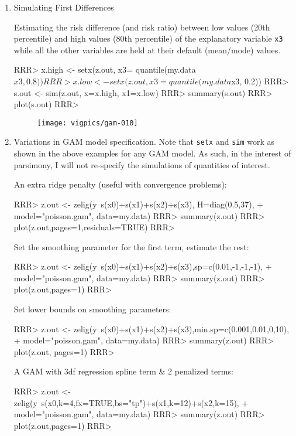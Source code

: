 \begin{enumerate}
\item Simulating First Differences

Estimating the risk difference (and risk ratio) between low values (20th percentile) and high values (80th percentile) of the explanatory variable {\tt x3} while all the other variables are held at their default (mean/mode) values. 

\begin{Schunk}
\begin{Sinput}
RRR> x.high <- setx(z.out,  x3= quantile(my.data$x3, 0.8))
RRR> x.low <- setx(z.out, x3 = quantile(my.data$x3, 0.2))
RRR> s.out <- sim(z.out, x=x.high, x1=x.low)
RRR> summary(s.out)
RRR> plot(s.out)
RRR> 
\end{Sinput}
\end{Schunk}
\begin{figure}[here]
\centering
\texttt{[image: vigpics/gam-010]}
\label{fig:plotgam}
\end{figure}

\item Variations in GAM model specification. Note that {\tt setx} and {\tt sim} work as shown in the above examples for any GAM model. As such, in the interest of parsimony, I will not re-specify the simulations of quantities of interest. 

An extra ridge penalty (useful with convergence problems):
\begin{Schunk}
\begin{Sinput}
RRR> z.out <- zelig(y~s(x0)+s(x1)+s(x2)+s(x3), H=diag(0.5,37), 
+    model="poisson.gam", data=my.data) 
RRR> summary(z.out)
RRR> plot(z.out,pages=1,residuals=TRUE)
RRR> 
\end{Sinput}
\end{Schunk}
Set the smoothing parameter for the first term, estimate the rest:
\begin{Schunk}
\begin{Sinput}
RRR> z.out <- zelig(y~s(x0)+s(x1)+s(x2)+s(x3),sp=c(0.01,-1,-1,-1), 
+    model="poisson.gam", data=my.data)
RRR> summary(z.out)
RRR> plot(z.out,pages=1)
RRR> 
\end{Sinput}
\end{Schunk}
Set lower bounds on smoothing parameters:
\begin{Schunk}
\begin{Sinput}
RRR> z.out <- zelig(y~s(x0)+s(x1)+s(x2)+s(x3),min.sp=c(0.001,0.01,0,10),  
+     model="poisson.gam", data=my.data) 
RRR> summary(z.out)
RRR> plot(z.out, pages=1)
RRR> 
\end{Sinput}
\end{Schunk}
A GAM with 3df regression spline term \& 2 penalized terms:
\begin{Schunk}
\begin{Sinput}
RRR> z.out <-zelig(y~s(x0,k=4,fx=TRUE,bs="tp")+s(x1,k=12)+s(x2,k=15), 
+     model="poisson.gam", data=my.data)
RRR> summary(z.out)
RRR> plot(z.out,pages=1)
RRR> 
\end{Sinput}
\end{Schunk}
\end{enumerate}



